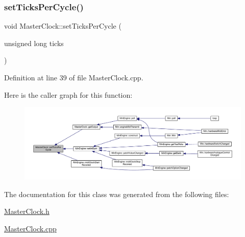 \subsubsection{\texorpdfstring{set\+Ticks\+Per\+Cycle()}{setTicksPerCycle()}}
{\footnotesize\ttfamily void Master\+Clock\+::set\+Ticks\+Per\+Cycle (\begin{DoxyParamCaption}\item[{unsigned long}]{ticks }\end{DoxyParamCaption})}



Definition at line 39 of file Master\+Clock.\+cpp.

Here is the caller graph for this function\+:
\nopagebreak
\begin{figure}[H]
\begin{center}
\leavevmode
\includegraphics[width=350pt]{d6/dc3/class_master_clock_a5df4dcf8523b8186a7c73f9357376a01_icgraph}
\end{center}
\end{figure}


The documentation for this class was generated from the following files\+:\begin{DoxyCompactItemize}
\item 
\hyperlink{_master_clock_8h}{Master\+Clock.\+h}\item 
\hyperlink{_master_clock_8cpp}{Master\+Clock.\+cpp}\end{DoxyCompactItemize}

